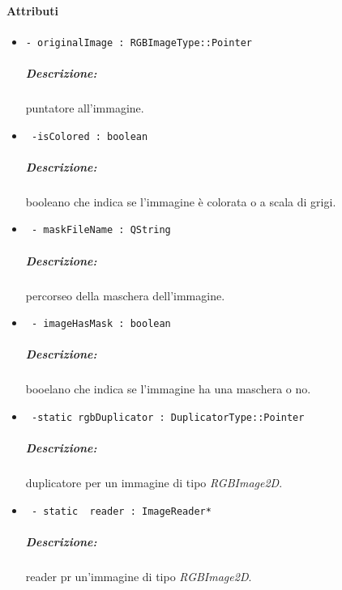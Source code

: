 \paragraph{Attributi}
	\begin{itemize}
		\item \color{teal}\verb!- originalImage : RGBImageType::Pointer !\\
		\color{black}
		\subparagraph{Descrizione:} puntatore all'immagine.
		
		\item \color{teal}\verb! -isColored : boolean!\\
		\color{black}
		\subparagraph{Descrizione:} booleano che indica se l'immagine è colorata o a scala di grigi.
		
		\item \color{teal}\verb! - maskFileName : QString!\\
		\color{black}
		\subparagraph{Descrizione:} percorseo della maschera\g{} dell'immagine.
		
		\item \color{teal}\verb! - imageHasMask : boolean!\\
		\color{black}
		\subparagraph{Descrizione:} booelano che indica se l'immagine ha una maschera o no.
		
		\item \color{teal}\verb! -static rgbDuplicator : DuplicatorType::Pointer !\\
		\color{black}
		\subparagraph{Descrizione:} duplicatore per un immagine di tipo \textsl{RGBImage2D}.
		
		\item \color{teal}\verb! - static  reader : ImageReader*!
		\color{black}
		\subparagraph{Descrizione:} reader pr un'immagine di tipo \textsl{RGBImage2D}.
		

	\end{itemize}

\color{black}
